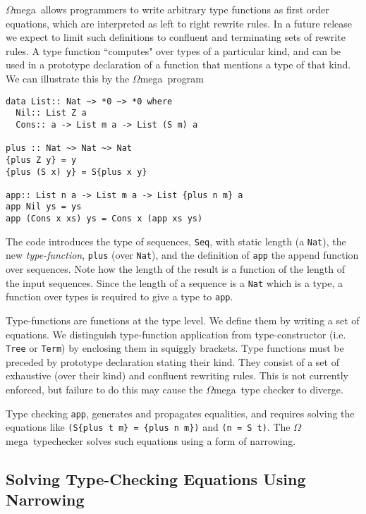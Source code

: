 \documentclass[11pt,twoside]{article}
\newcommand{\om}{$\Omega$mega}
\begin{document}
\om\ allows programmers to write arbitrary type functions
as first order equations, which are interpreted as left to right
rewrite rules. In a future release we expect
to limit such definitions to confluent
and terminating sets of rewrite rules. A type function ``computes" over
types of a particular kind, and can be used in a prototype declaration
of a function that mentions a type of that kind. We can illustrate this
by the \om\ program
\begin{verbatim}
data List:: Nat ~> *0 ~> *0 where
  Nil:: List Z a
  Cons:: a -> List m a -> List (S m) a

plus :: Nat ~> Nat ~> Nat
{plus Z y} = y
{plus (S x) y} = S{plus x y}

app:: List n a -> List m a -> List {plus n m} a
app Nil ys = ys
app (Cons x xs) ys = Cons x (app xs ys)

\end{verbatim}

The code introduces the type of sequences, {\tt Seq}, with static length
(a {\tt Nat}), the new {\em type-function}, {\tt plus} (over {\tt Nat}),
and the definition of {\tt app} the append function
over sequences. Note how the length of the result is a function
of the length of the input sequences. Since the length of a sequence is
a {\tt Nat} which is a type, a function over types is required
to give a type to {\tt app}.

Type-functions are functions at the type level. We define them by
writing a set of equations. We distinguish type-function application
from type-constructor (i.e. {\tt Tree} or {\tt Term}) by enclosing them
in squiggly brackets. Type functions must be preceded by prototype
declaration stating their kind. They consist of a set of exhaustive
(over their kind) and confluent rewriting rules.
This is not currently
enforced, but failure to do this may cause the \om\ type checker to
diverge.

Type checking {\tt app}, generates and propagates equalities, and requires
solving the equations like {\tt (S\{plus t m\} = \{plus n m\})} and {\tt (n =
S t)}. The \om\ typechecker solves such equations using a form of narrowing.

\subsection{Solving Type-Checking Equations Using Narrowing}
\end{document}
